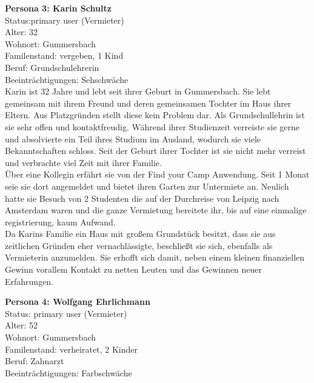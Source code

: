 \newpage
\textbf{Persona 3: Karin Schultz}\\
Status:primary user (Vermieter)\\

Alter: 32\\
Wohnort: Gummersbach\\
Familenstand: vergeben, 1 Kind\\
Beruf: Grundschulehrerin\\
Beeinträchtigungen: Sehschwäche\\

Karin ist 32 Jahre und lebt seit ihrer Geburt in Gummersbach. Sie lebt gemeinsam mit ihrem Freund und deren gemeinsamen Tochter im Haus ihrer Eltern. Aus Platzgründen stellt diese kein Problem dar.
Als Grundschullehrin ist sie sehr offen und kontaktfreudig. Während ihrer Studienzeit verreiste sie gerne und absolvierte ein Teil ihres Studium im Ausland, wodurch sie viele Bekanntschaften schloss.
Seit der Geburt ihrer Tochter ist sie nicht mehr verreist und verbrachte viel Zeit mit ihrer Familie. \\

Über eine Kollegin erfährt sie von der Find your Camp Anwendung. Seit 1 Monat seie sie dort angemeldet und bietet ihren Garten zur Untermiete an. Neulich hatte sie Besuch von 2 Studenten die auf der Durchreise von Leipzig nach Amsterdam waren und die ganze Vermietung bereitete ihr, bis auf eine einmalige registrierung, kaum Aufwand.\\

Da Karins Familie ein Haus mit großem Grundstück besitzt, dass sie aus zeitlichen Gründen eher vernachlässigte, beschließt sie sich, ebenfalls als Vermieterin anzumelden. Sie erhofft sich damit, neben einem kleinen finanziellen Gewinn vorallem Kontakt zu netten Leuten und das Gewinnen neuer Erfahrungen.

\newpage
\textbf{Persona 4: Wolfgang Ehrlichmann}\\
Status: primary user (Vermieter)\\

Alter: 52\\
Wohnort: Gummersbach\\
Familenstand: verheiratet, 2 Kinder\\
Beruf: Zahnarzt\\
Beeinträchtigungen: Farbschwäche\\


